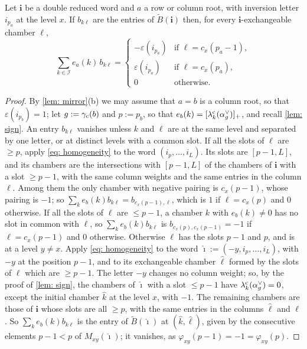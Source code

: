 \documentclass[a4paper]{amsart}
\numberwithin{equation}{section}
\theoremstyle{definition}
\theoremstyle{remark}
\newcommand{\mcI}{\mathcal{I}}
\newcommand{\bfi}{\mathbf{i}}
\newcommand{\tB}{\widetilde{B}}
\newcommand{\cc}{{\rm c}}
\begin{document}
\begin{lemma}
  \label{lem: exponents}
  Let $\bfi$ be a double reduced word and $a$ a row or column root, with inversion letter $i_{p_a}$ at the level $x$.
  If $b_{k\ell}$ are the entries of $\tB(\bfi)$ then, for every $\bfi$-exchangeable chamber $\ell$,
  \[
    \sum_{k\in\mcI}e_a(k)\,b_{k\ell}=
    \begin{cases}
      -\varepsilon(i_{p_a})&\text{if }\ell=c_x(p_a-1),\\
      \varepsilon(i_{p_a})&\text{if }\ell=c_x(p_a),\\
      0&\text{otherwise}.
    \end{cases}
  \]
\end{lemma}
\begin{proof}
  By \cref{lem: mirror}(b) we may assume that $a=b$ is a column root, so that $\varepsilon(i_{p_b})=1$; let $g:=\gamma_{\cc}(b)$ and $p:=p_b$, so that $e_b(k)=[\lambda^\cc_k(\alpha_g^\vee)]_+$, and recall \cref{lem: sign}.
  An entry $b_{k\ell}$ vanishes unless $k$ and $\ell$ are at the same level and separated by one letter, or at distinct levels with a common slot.
  If all the slots of $\ell$ are $\ge p$, apply \eqref{eq: homogeneity} to the word $(i_p,\dots,i_L)$.
  Its slots are $[p-1,L]$, and its chambers are the intersections with $[p-1,L]$ of the chambers of $\bfi$ with a slot $\ge p-1$, with the same column weights and the same entries in the column $\ell$.
  Among them the only chamber with negative pairing is $c_x(p-1)$, whose pairing is $-1$; so $\sum_ke_b(k)b_{k\ell}=b_{c_x(p-1),\ell}$, which is $1$ if $\ell=c_x(p)$ and $0$ otherwise.
  If all the slots of $\ell$ are $\le p-1$, a chamber $k$ with $e_b(k)\neq0$ has no slot in common with $\ell$, so $\sum_ke_b(k)b_{k\ell}$ is $b_{c_x(p),c_x(p-1)}=-1$ if $\ell=c_x(p-1)$ and $0$ otherwise.
  Otherwise $\ell$ has the slots $p-1$ and $p$, and is at a level $y\neq x$.
  Apply \eqref{eq: homogeneity} to the word $\hat{\boldsymbol{\imath}}:=(-y,i_p,\dots,i_L)$, with $-y$ at the position $p-1$, and to its exchangeable chamber $\hat\ell$ formed by the slots of $\ell$ which are $\ge p-1$.
  The letter $-y$ changes no column weight; so, by the proof of \cref{lem: sign}, the chambers of $\hat{\boldsymbol{\imath}}$ with a slot $\le p-1$ have $\lambda^\cc_k(\alpha_g^\vee)=0$, except the initial chamber $\hat k$ at the level $x$, with $-1$.
  The remaining chambers are those of $\bfi$ whose slots are all $\ge p$, with the same entries in the columns $\hat\ell$ and $\ell$.
  So $\sum_ke_b(k)b_{k\ell}$ is the entry of $\tB(\hat{\boldsymbol{\imath}})$ at $(\hat k,\hat\ell)$, given by the consecutive elements $p-1<p$ of $M_{xy}(\hat{\boldsymbol{\imath}})$; it vanishes, as $\varphi_{xy}(p-1)=-1=\varphi_{xy}(p)$.
\end{proof}
\end{document}
